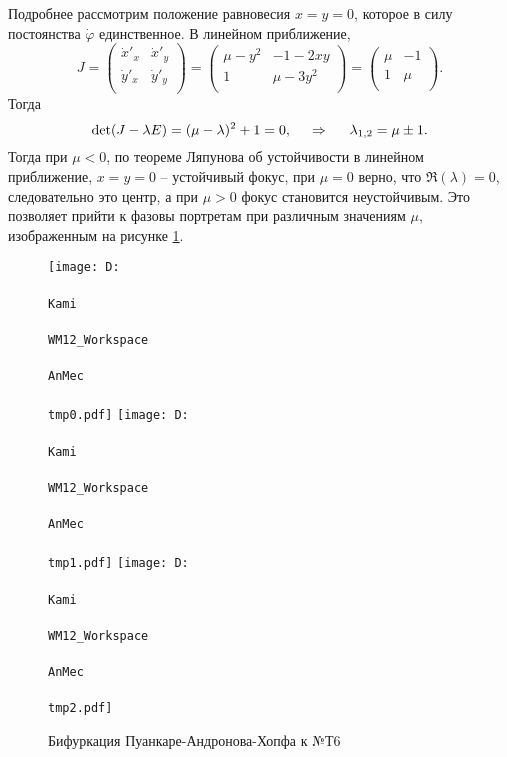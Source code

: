 Подробнее рассмотрим положение равновесия $x=y=0$, которое в силу постоянства $\dot{\varphi}$ единственное. В линейном приближение, 
\begin{equation*}
    J = \begin{pmatrix}
        \dot{x}'_x & \dot{x}'_y \\
        \dot{y}'_x & \dot{y}'_y \\
    \end{pmatrix}
    = 
    \begin{pmatrix}
        \mu-y^2 & -1-2xy \\
        1 & \mu - 3 y^2 \\
    \end{pmatrix} = \begin{pmatrix}
        \mu & -1 \\
        1 & \mu \\
    \end{pmatrix}.
\end{equation*}
Тогда 
\begin{equation*}
    \det(J - \lambda E) = (\mu - \lambda)^2 + 1 = 0,
    \hspace{0.5cm} \Rightarrow \hspace{0.5cm}
    \lambda_{1, 2} = \mu \pm 1.
\end{equation*}
Тогда при $\mu < 0$, по теореме Ляпунова об устойчивости в линейном приближение, $x=y=0$ -- устойчивый фокус, при $\mu = 0$ верно, что $\Re (\lambda) = 0$, следовательно это центр, а при $\mu > 0$ фокус становится неустойчивым. Это позволяет прийти к фазовы портретам при различным значениям $\mu$, изображенным на рисунке \ref{T6}.

\begin{figure}[ht]
    \centering
    \texttt{[image: D:\\\\Kami\\\\WM12\_Workspace\\\\AnMec\\\\tmp0.pdf]}
    \hspace{0.2cm}
    \texttt{[image: D:\\\\Kami\\\\WM12\_Workspace\\\\AnMec\\\\tmp1.pdf]}
    \hspace{0.2cm}
    \texttt{[image: D:\\\\Kami\\\\WM12\_Workspace\\\\AnMec\\\\tmp2.pdf]}
    \caption{Бифуркация Пуанкаре-Андронова-Хопфа к №Т6}
    \label{T6}
\end{figure}